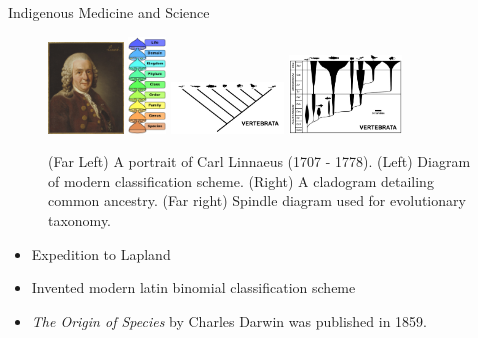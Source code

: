 \documentclass{beamer}
\begin{document}
\begin{frame}{Indigenous Medicine and Science}
\begin{figure}
\includegraphics[width=2cm]{figures/linnaeus.jpg} \hspace{0.5cm}
\includegraphics[width=1.0cm]{figures/class1.png}
\includegraphics[width=3cm]{figures/class2.jpg}
\includegraphics[width=3cm]{figures/class3.jpg}
\caption{(Far Left) A portrait of Carl Linnaeus (1707 - 1778).  (Left) Diagram of modern classification scheme. (Right) A cladogram detailing common ancestry. (Far right) Spindle diagram used for evolutionary taxonomy.}
\end{figure}
\small
\begin{itemize}
\item Expedition to Lapland
\item Invented modern latin binomial classification scheme
\item \textit{The Origin of Species} by Charles Darwin was published in 1859.
\end{itemize}
\end{frame}
\end{document}
